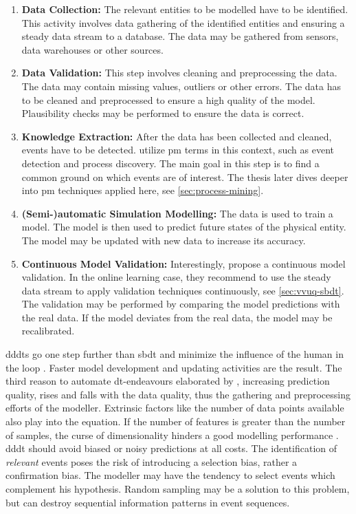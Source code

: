 \begin{enumerate}
    \item \textbf{Data Collection:} The relevant entities to be modelled have to be identified. This activity involves data gathering of the identified entities and ensuring a steady data stream to a database. The data may be gathered from sensors, data warehouses or other sources.
    \item \textbf{Data Validation:} This step involves cleaning and preprocessing the data. The data may contain missing values, outliers or other errors. The data has to be cleaned and preprocessed to ensure a high quality of the model. Plausibility checks may be performed to ensure the data is correct.
    \item \textbf{Knowledge Extraction:} After the data has been collected and cleaned, events have to be detected.  utilize \gls{pm} terms in this context, such as event detection and process discovery. The main goal in this step is to find a common ground on which events are of interest. The thesis later dives deeper into \gls{pm} techniques applied here, see \autoref{sec:process-mining}.
    \item \textbf{(Semi-)automatic Simulation Modelling:} The data is used to train a model. The model is then used to predict future states of the physical entity. The model may be updated with new data to increase its accuracy.
    \item \textbf{Continuous Model Validation:} Interestingly, \citeauthor{francis2021towards} propose a continuous model validation. In the online learning case, they recommend to use the steady data stream to apply validation techniques continuously, see \autoref{sec:vvuq-sbdt}. The validation may be performed by comparing the model predictions with the real data. If the model deviates from the real data, the model may be recalibrated.
\end{enumerate}

\gls{dddt}s go one step further than \gls{sbdt} and minimize the influence of the human in the loop \autocite{francis2021towards,Friederich2022}. Faster model development and updating activities are the result. The third reason to automate \gls{dt}-endeavours elaborated by \textcite{Schwede2024}, increasing prediction quality, rises and falls with the data quality, thus the gathering and preprocessing efforts of the modeller. Extrinsic factors like the number of data points available also play into the equation. If the number of features is greater than the number of samples, the curse of dimensionality hinders a good modelling performance \autocite{koppen2000curse}. \gls{dddt} should avoid biased or noisy predictions at all costs. The identification of \textit{relevant} events poses the risk of introducing a selection bias, rather a confirmation bias. The modeller may have the tendency to select events which complement his hypothesis. Random sampling may be a solution to this problem, but can destroy sequential information patterns in event sequences.

